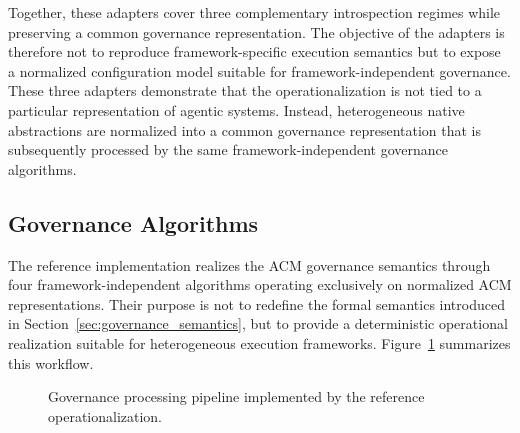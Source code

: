 \documentclass[10pt]{article}
\begin{document}
Together, these adapters cover three complementary introspection regimes while preserving a common governance representation. The objective of the adapters is therefore not to reproduce framework-specific execution semantics but to expose a normalized configuration model suitable for framework-independent governance.
These three adapters demonstrate that the operationalization is not tied to a particular representation of agentic systems. Instead, heterogeneous native abstractions are normalized into a common governance representation that is subsequently processed by the same framework-independent governance algorithms.

\subsection{Governance Algorithms}
\label{sec:governance_algorithms}

The reference implementation realizes the ACM governance semantics through four framework-independent algorithms operating exclusively on normalized ACM representations. Their purpose is not to redefine the formal semantics introduced in Section~\ref{sec:governance_semantics}, but to provide a deterministic operational realization suitable for heterogeneous execution frameworks. Figure~\ref{fig:governance_processing_pipeline} summarizes this workflow.

\begin{figure}[ht]
	\centering
	
	\caption{Governance processing pipeline implemented by the reference operationalization.}
	\label{fig:governance_processing_pipeline}
\end{figure}
\end{document}
